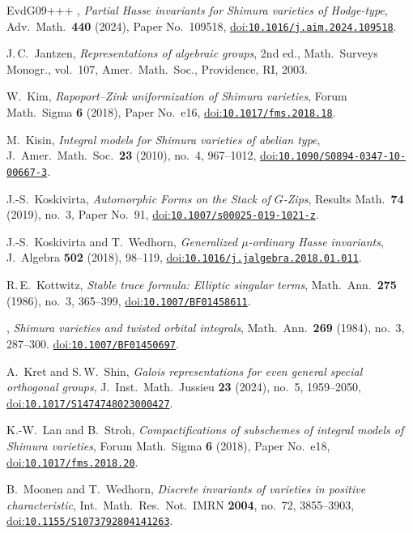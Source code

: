 \documentclass[10pt,a4paper]{article}
\numberwithin{equation}{section}
\newcommand{\doi}[1]{\href{https://doi.org/#1}{doi:\nolinkurl{#1}}}
\theoremstyle{definition}
\theoremstyle{remark}
\begin{document}
\begin{thebibliography}{EvdG09+++}
\bysame, \emph{Partial {H}asse invariants for {S}himura varieties of
  {H}odge-type}, Adv.\ Math.\ \textbf{440} (2024), Paper No.~109518,
\doi{10.1016/j.aim.2024.109518}.

J.\,C.~Jantzen, \emph{Representations of algebraic groups}, 2nd ed., Math.\ Surveys  Monogr., vol.~107, Amer.\ Math.\ Soc., Providence, RI,
  2003.

W.~Kim, \emph{Rapoport--{Z}ink uniformization of {S}himura varieties}, Forum
  Math.\ Sigma \textbf{6} (2018), Paper No.~e16,  
\doi{10.1017/fms.2018.18}.

M.~Kisin, \emph{Integral models for {S}himura varieties of abelian type},
  J.~Amer.\ Math.\ Soc.\ \textbf{23} (2010), no.~4, 967--1012, 
\doi{10.1090/S0894-0347-10-00667-3}.

J.-S.~Koskivirta, \emph{Automorphic Forms on the Stack of {$G$}-Zips}, Results
  Math.\ \textbf{74} (2019), no.~3, Paper No.~91,  
\doi{10.1007/s00025-019-1021-z}.

J.-S.~Koskivirta and T.~Wedhorn, \emph{Generalized {$\mu$}-ordinary {H}asse
  invariants}, J.~Algebra \textbf{502} (2018), 98--119, 
\doi{10.1016/j.jalgebra.2018.01.011}.

R.\,E.~Kottwitz, \emph{Stable trace formula: Elliptic singular terms}, Math.\ Ann.\
  \textbf{275} (1986), no.~3, 365--399, \doi{10.1007/BF01458611}.

\bysame, \emph{Shimura varieties and twisted orbital integrals},
  Math.\ Ann.\ \textbf{269} (1984), no.~3, 287--300. 
  \doi{10.1007/BF01450697}.
  

A.~Kret and S.\,W.~Shin, \emph{Galois representations for even general special
  orthogonal groups}, J.~Inst.\ Math.\ Jussieu \textbf{23} (2024), no.~5,
  1959--2050, \doi{10.1017/S1474748023000427}.

K.-W.~Lan and B.~Stroh, \emph{Compactifications of subschemes of integral models  of {S}himura varieties}, Forum Math.\ Sigma \textbf{6} (2018), Paper No.~e18, 
\doi{10.1017/fms.2018.20}.

B.~Moonen and T.~Wedhorn, \emph{Discrete invariants of varieties in positive
  characteristic}, Int.\ Math.\ Res.\ Not.\ IMRN \textbf{2004}, no.~72, 3855--3903, \doi{10.1155/S1073792804141263}.


\end{thebibliography}
\end{document}

